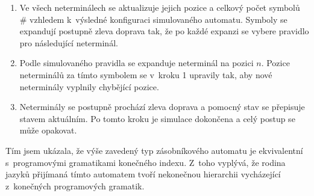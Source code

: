 \begin{enumerate}
\item Ve všech neterminálech se aktualizuje jejich pozice a celkový počet symbolů \# vzhledem k~výsledné konfiguraci simulovaného automatu. Symboly se expandují postupně zleva doprava tak, že po každé expanzi se vybere pravidlo pro následující neterminál. 
\item Podle simulovaného pravidla se expanduje neterminál na pozici $n$. Pozice neterminálů za tímto symbolem se v~kroku 1 upravily tak, aby nové neterminály vyplnily chybějící pozice.
\item Neterminály se postupně prochází zleva doprava a pomocný stav se přepisuje stavem aktuálním. Po tomto kroku je simulace dokončena a celý postup se může opakovat.
\end{enumerate}

Tím jsem ukázala, že výše zavedený typ zásobníkového automatu je ekvivalentní s~programovými gramatikami konečného indexu. Z~toho vyplývá, že rodina jazyků přijímaná tímto automatem tvoří nekonečnou hierarchii vycházející z~konečných programových gramatik.


